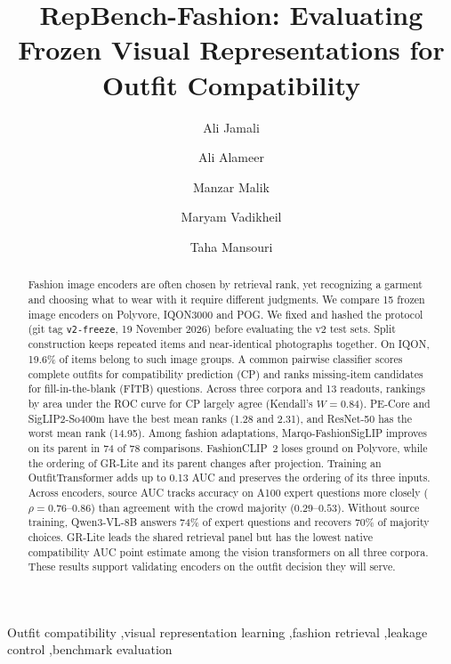 \documentclass[preprint,12pt]{elsarticle}
\begin{document}
\begin{frontmatter}
\title{RepBench-Fashion: Evaluating Frozen Visual Representations for Outfit Compatibility}
\author[salford]{Ali Jamali}
\author[salford]{Ali Alameer}
\author[salford]{Manzar Malik}
\author[salford]{Maryam Vadikheil}
\author[salford]{Taha Mansouri}

\begin{abstract}
Fashion image encoders are often chosen by retrieval rank, yet recognizing a garment and choosing what to wear with it require different judgments. We compare 15 frozen image encoders on Polyvore, IQON3000 and POG. We fixed and hashed the protocol (git tag \texttt{v2-freeze}, 19 November 2026) before evaluating the v2 test sets. Split construction keeps repeated items and near-identical photographs together. On IQON, 19.6\% of items belong to such image groups. A common pairwise classifier scores complete outfits for compatibility prediction (CP) and ranks missing-item candidates for fill-in-the-blank (FITB) questions. Across three corpora and 13 readouts, rankings by area under the ROC curve for CP largely agree (Kendall's $W=0.84$). PE-Core and SigLIP2-So400m have the best mean ranks (1.28 and 2.31), and ResNet-50 has the worst mean rank (14.95). Among fashion adaptations, Marqo-FashionSigLIP improves on its parent in 74 of 78 comparisons. FashionCLIP~2 loses ground on Polyvore, while the ordering of GR-Lite and its parent changes after projection. Training an OutfitTransformer adds up to 0.13 AUC and preserves the ordering of its three inputs. Across encoders, source AUC tracks accuracy on A100 expert questions more closely ($\rho=0.76$--$0.86$) than agreement with the crowd majority ($0.29$--$0.53$). Without source training, Qwen3-VL-8B answers 74\% of expert questions and recovers 70\% of majority choices. GR-Lite leads the shared retrieval panel but has the lowest native compatibility AUC point estimate among the vision transformers on all three corpora. These results support validating encoders on the outfit decision they will serve.
\end{abstract}
\begin{keyword}
Outfit compatibility \sep visual representation learning \sep fashion retrieval \sep leakage control \sep benchmark evaluation
\end{keyword}

\end{frontmatter}


\end{document}
